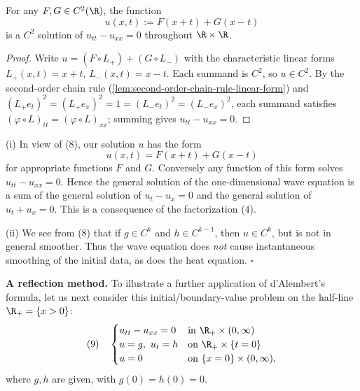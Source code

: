 \begin{theorem}
\label{thm:wave-1d-general-solution}
\leanok
For any $F, G \in C^2(\R)$, the function
$$u(x,t) := F(x+t) + G(x-t)$$
is a $C^2$ solution of $u_{tt} - u_{xx} = 0$ throughout $\R \times \R$.
\end{theorem}
\begin{proof}
\leanok
Write $u = (F \circ L_+) + (G \circ L_-)$ with the characteristic linear forms
$L_+(x,t) = x+t$, $L_-(x,t) = x-t$. Each summand is $C^2$, so $u \in C^2$. By the
second-order chain rule (\cref{lem:second-order-chain-rule-linear-form}) and
$(L_+ e_t)^2 = (L_+ e_x)^2 = 1 = (L_- e_t)^2 = (L_- e_x)^2$, each summand
satisfies $(\varphi \circ L)_{tt} = (\varphi \circ L)_{xx}$; summing gives
$u_{tt} - u_{xx} = 0$.
\end{proof}

\begin{remark}
\label{rem:wave-equation-general-solution-1d}
(i) In view of (8), our solution $u$ has the form
$$u(x,t) = F(x+t) + G(x-t)$$
for appropriate functions $F$ and $G$. Conversely any function of this form solves $u_{tt} - u_{xx} = 0$. Hence the general solution of the one-dimensional wave equation is a sum of the general solution of $u_t - u_x = 0$ and the general solution of $u_t + u_x = 0$. This is a consequence of the factorization (4).

(ii) We see from (8) that if $g \in C^k$ and $h \in C^{k-1}$, then $u \in C^k$, but is not in general smoother. Thus the wave equation does \textit{not} cause instantaneous smoothing of the initial data, as does the heat equation. $\square$
\end{remark}

\textbf{A reflection method.} To illustrate a further application of d'Alembert's formula, let us next consider this initial/boundary-value problem on the half-line $\R_+ = \{x>0\}$:
$$(9) \quad \begin{cases} u_{tt} - u_{xx} = 0 & \text{in } \R_+\times(0,\infty) \\ u=g,\ u_t=h & \text{on }\R_+\times\{t=0\} \\ u=0 & \text{on }\{x=0\}\times(0,\infty), \end{cases}$$
where $g,h$ are given, with $g(0) = h(0) = 0$.

